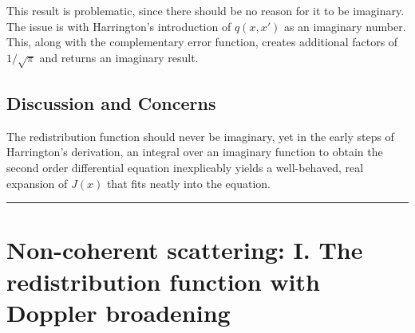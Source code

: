 \documentclass[onecolumn]{aastex63}
\begin{document}
This result is problematic, since there should be no reason for it to be imaginary. The issue is with Harrington's introduction of $q(x, x')$ as an imaginary number. This, along with the complementary error function, creates additional factors of $1/\sqrt{\pi}$ and returns an imaginary result.

\subsection{Discussion and Concerns}

The redistribution function should never be imaginary, yet in the early steps of Harrington's derivation, an integral over an imaginary function to obtain the second order differential equation inexplicably yields a well-behaved, real expansion of $J(x)$ that fits neatly into the equation.



\vspace{1cm}
\hrule
\vspace{1cm}

\section{ Non-coherent scattering: I. The redistribution function with Doppler broadening}
\begin{centering}

\cite{hummer1962}

\end{centering}


\end{document}
